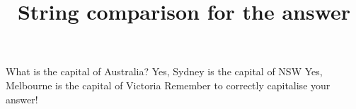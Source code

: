 \documentclass[hidesidemenu]{webquiz}
\title{String comparison for the answer}
\begin{document}
  \begin{question}     %
     What is the capital of Australia?
     \whenRight Yes, Sydney is the capital of NSW
     \whenRight Yes, Melbourne is the capital of Victoria
     \whenWrong Remember to correctly capitalise your answer!
  \end{question}
\end{document}
